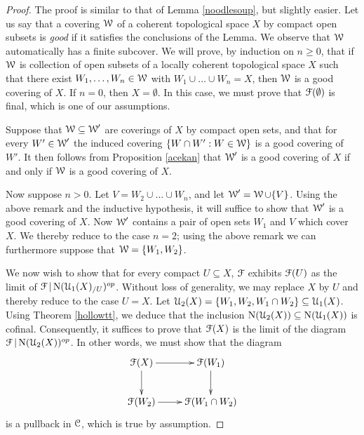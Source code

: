 \begin{proof}
The proof is similar to that of Lemma \ref{noodlesoup}, but slightly easier.
Let us say that a covering $\operatorname{\mathcal{W}}$ of a coherent topological space $X$ by compact open subsets
is {\it good} if it satisfies the conclusions of the Lemma. We observe that $\operatorname{\mathcal{W}}$ automatically has a finite subcover. We will prove, by induction on $n \geq 0$, that if $\operatorname{\mathcal{W}}$ is collection of open subsets of a locally coherent topological space $X$ such that there exist $W_1, \ldots, W_n \in \operatorname{\mathcal{W}}$ with
$W_1 \cup \ldots \cup W_n = X$, then $\operatorname{\mathcal{W}}$ is a good covering of $X$. If $n = 0$, then
$X = \emptyset$. In this case, we must prove that 
$\operatorname{\mathcal{F}}(\emptyset)$ is final, which is one of our assumptions.

Suppose that $\operatorname{\mathcal{W}} \subseteq \operatorname{\mathcal{W}}'$ are coverings of $X$ by compact open sets, and that for every $W' \in \operatorname{\mathcal{W}}'$ the induced covering $\{ W \cap W': W \in \operatorname{\mathcal{W}} \}$ is a good covering of $W'$. It then follows from Proposition \ref{acekan} that $\operatorname{\mathcal{W}}'$ is a good covering of $X$ if and only if $\operatorname{\mathcal{W}}$ is a good covering of $X$.

Now suppose $n > 0$. Let $V = W_2 \cup \ldots \cup W_n$, and let $\operatorname{\mathcal{W}}' = \operatorname{\mathcal{W}} \cup \{V\}$. Using the above remark and the inductive hypothesis, it will suffice to show that $\operatorname{\mathcal{W}}'$ is a good covering of $X$. Now $\operatorname{\mathcal{W}}'$ contains a pair of open sets $W_1$ and $V$ which cover $X$. 
We thereby reduce to the case $n=2$; using the above remark we can furthermore suppose that
$\operatorname{\mathcal{W}} = \{ W_1, W_2 \}$. 

We now wish to show that for every compact $U \subseteq X$, $\operatorname{\mathcal{F}}$ exhibits
$\operatorname{\mathcal{F}}(U)$ as the limit of $\operatorname{\mathcal{F}} | \operatorname{N}(\operatorname{\mathcal{U}}_1(X)_{/U})^{op}$. Without loss of generality,
we may replace $X$ by $U$ and thereby reduce to the case $U=X$. Let
$\operatorname{\mathcal{U}}_2(X) = \{ W_1, W_2, W_1 \cap W_2 \} \subseteq \operatorname{\mathcal{U}}_1(X)$. Using Theorem
\ref{hollowtt}, we deduce that the inclusion $\operatorname{N}(\operatorname{\mathcal{U}}_2(X)) \subseteq \operatorname{N}(\operatorname{\mathcal{U}}_1(X))$ is cofinal. Consequently, it suffices to prove that $\operatorname{\mathcal{F}}(X)$ is the limit of the diagram
$\operatorname{\mathcal{F}} | \operatorname{N}(\operatorname{\mathcal{U}}_2(X) )^{op}$. In other words, we must show that the diagram
$$ \xymatrix{ \calF(X) \ar[r] \ar[d] & \calF(W_1) \ar[d] \\
\calF(W_2) \ar[r] & \calF(W_1 \cap W_2) }$$
is a pullback in $\operatorname{\mathcal{C}}$, which is true by assumption.
\end{proof}

